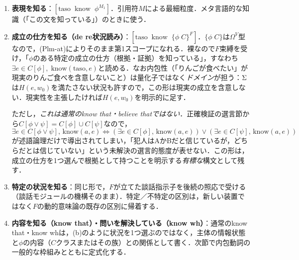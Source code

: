 \documentclass[../../main-detail.tex]{subfiles}
\begin{document}
\begin{enumerate}
    \item[(a)] \textbf{表現を知る}：$[\text{taso}\;\; \mathrm{know}\;\; \phi^{M_1}]$．引用符$M$による最細粒度．メタ言語的な知識（「この文を知っている」）のときに使う．
    \item[(b)] \textbf{成立の仕方を知る（de re状況読み）}：$[\text{taso}\;\; \mathrm{know}\;\; \{\phi\; C\}^{F}]$．$\{\phi\;C\}$は$\Omega^V$型なので，(Plm-at)によりそのまま第1スコープになれる．裸なので$F$束縛を受け，「$\phi$のある特定の成立の仕方（根拠・証拠）を知っている」，すなわち$\exists e \in C[\phi],\; \mathrm{know}(\text{taso}, e)$と読める．なお内包性（「りんごが食べたい」が現実のりんご食べを含意しないこと）は量化子ではなく\emph{ドメイン}が担う：$\Sigma$は$H(e,w_0)$を満たさない状況も許すので，この形は現実の成立を含意しない．現実性を主張したければ$H(e,w_0)$を明示的に足す．

    ただし，\emph{これは通常のknow that・believe thatではない}．正確検証の選言節から$C[\phi\lor\psi] = C[\phi]\cup C[\psi]$なので，
    \[
        \exists e\in C[\phi\lor\psi],\,\mathrm{know}(a,e) \iff
        (\exists e\in C[\phi],\,\mathrm{know}(a,e)) \lor (\exists e\in C[\psi],\,\mathrm{know}(a,e))
    \]
    が述語論理だけで導出されてしまい，「犯人はAかBだと信じているが，どちらだとは信じていない」という未解決の選言的態度が表せない．この形は，成立の仕方を1つ選んで根拠として持つことを明示する\emph{有標な}構文として残す．
    \item[(c)] \textbf{特定の状況を知る}：同じ形で，$F$が立てた談話指示子を後続の照応で受ける（談話モジュールの機構そのまま）．特定／不特定の区別は，新しい装置ではなく$F$の動的意味論の既存の区別に帰着する．
    \item[(d)] \textbf{内容を知る（know that）・問いを解決している（know wh）}：通常のknow that・know whは，(b)のように状況を1つ選ぶのではなく，主体の情報状態と$\phi$の内容（$C$クラスまたはその族）との関係として書く．次節で内包動詞の一般的な枠組みとともに定式化する．
\end{enumerate}
\end{document}
